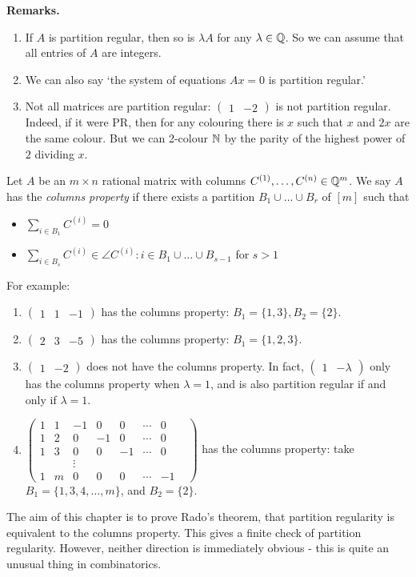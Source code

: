 \documentclass[10pt,a4paper]{article}
\begin{document}
\textbf{Remarks.}
\begin{enumerate}
  \item If $A$ is partition regular, then so is $\lambda A$ for any $\lambda \in \mathbb{Q}$. So we can assume that all entries of $A$ are integers.
  \item We can also say `the system of equations $Ax = 0$ is partition regular.'
  \item Not all matrices are partition regular: $\begin{pmatrix} 1 & -2 \end{pmatrix}$ is not partition regular. Indeed, if it were PR, then for any colouring there is $x$ such that $x$ and $2x$ are the same colour. But we can 2-colour $\mathbb{N}$ by the parity of the highest power of $2$ dividing $x$.
\end{enumerate}
Let $A$ be an $m \times n$ rational matrix with columns $C^{(1)}, \ldots, C^{(n)} \in \mathbb{Q}^m$. We say $A$ has the \emph{columns property} if there exists a partition $B_1 \cup \ldots \cup B_r$ of $[m]$ such that
\begin{itemize}
  \item $\sum_{i \in B_1}C^{(i)} = 0$
  \item $\sum_{i \in B_s}C^{(i)} \in \angle{C^{(i)}:i \in B_1 \cup\ldots \cup B_{s-1}}$ for $s >1$
\end{itemize}
For example:
\begin{enumerate}
  \item $\begin{pmatrix} 1 & 1 & -1 \end{pmatrix}$ has the columns property: $B_1 = \{1,3\}, B_2 = \{2\}$.
  \item $\begin{pmatrix} 2 & 3 & -5\end{pmatrix}$ has the columns property: $B_1 = \{1,2,3\}$.
  \item $\begin{pmatrix} 1 & -2 \end{pmatrix}$ does not have the columns property. In fact, $\begin{pmatrix} 1 & -\lambda \end{pmatrix}$ only has the columns property when $\lambda = 1$, and is also partition regular if and only if $\lambda = 1$.
  \item $\begin{pmatrix} 1 & 1 & -1 & 0 & 0 &\cdots & 0\\ 1 & 2 & 0 & -1&0 & \cdots & 0\\ 1 & 3 & 0 & 0 & -1 & \cdots & 0 \\  &  & \vdots & & & & & \\ 1 & m & 0 & 0& 0& \cdots & -1\end{pmatrix}$ has the columns property: take $B_1 = \{1,3,4,\ldots, m\}$, and $B_2 = \{2\}$.
\end{enumerate}
The aim of this chapter is to prove Rado's theorem, that partition regularity is equivalent to the columns property. This gives a finite check of partition regularity. However, neither direction is immediately obvious - this is quite an unusual thing in combinatorics.
\end{document}
